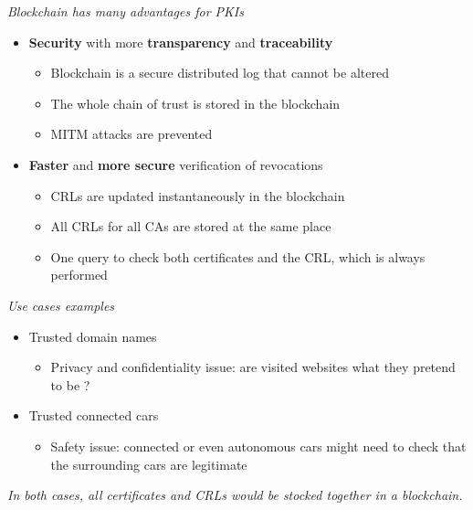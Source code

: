 \begin{frame}
\emph{Blockchain has many advantages for PKIs}

\begin{itemize}
\item \textbf{Security} with more \textbf{transparency} and \textbf{traceability}
\begin{itemize}
\item Blockchain is a secure distributed log that cannot be altered
\item The whole chain of trust is stored in the blockchain
\item MITM attacks are prevented
\end{itemize}
\item \textbf{Faster} and \textbf{more secure} verification of revocations
\begin{itemize}
\item CRLs are updated instantaneously in the blockchain
\item All CRLs for all CAs are stored at the same place
\item One query to check both certificates and the CRL, which is always performed
\end{itemize}
\end{itemize}

\end{frame}

\begin{frame}
\emph{Use cases examples}


\begin{itemize}
\item Trusted domain names
\begin{itemize}
\item Privacy and confidentiality issue: are visited websites what they pretend to be ?
\end{itemize}
\item Trusted connected cars
\begin{itemize}
\item Safety issue: connected or even autonomous cars might need to check that the surrounding cars are legitimate
\end{itemize}
\end{itemize}

\emph{In both cases, all certificates and CRLs would be stocked together in a blockchain.}





\end{frame}